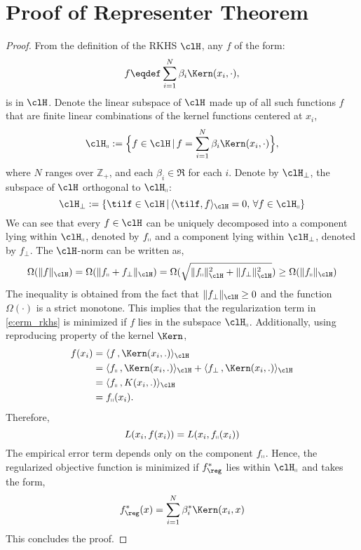 \chapter{Proof of Representer Theorem }%
\label{a:rep_theorem}

\begin{proof}
	From the definition of the RKHS $\clH$, any $f$ of the form:
	\[
	f \eqdef \sum_{i=1}^N  
	\beta_i \Kern(x_i,\cdot),
	\]
	is in $\clH$. 	
	Denote the linear subspace of $\clH$ made up of all such functions $f$ that are finite linear combinations of the kernel functions centered at $x_i$,
	\[
	\clH_\shortparallel := \Bigl\{f \in \clH\, |\, f = \sum_{i=1}^N  \beta_i \Kern(x_i,\cdot) \Bigr\},
	\]
	where $N$ ranges over $\mathbb{Z}_+$, and  each $\beta_i \in \Re$ for each $i$. Denote by $\clH_{\perp}$, the subspace of $\clH$ orthogonal to $\clH_\shortparallel$:
	\[
	\clH_\perp : = \{ \tilf \in \clH\,| \, \langle \tilf , f \rangle_\clH = 0 ,\, \forall f \in \clH_\shortparallel \}
	\]
	We can see that every $f \in \clH$ can be uniquely decomposed into a component lying within $\clH_\shortparallel$, denoted by $f_\shortparallel$ and a component lying within $\clH_\perp$, denoted by $f_\perp$.
	The $\clH$-norm can be written as,
	\[
	\Omega(\|f\|_\clH) = \Omega( \|f_\shortparallel + f_\perp\|_\clH) =\Omega( \sqrt{\|f_\shortparallel\|^2_\clH + \|f_\perp\|^2_\clH})  \geq \Omega(\|f_\shortparallel\|_\clH)
	\]
	The inequality is obtained from the fact that $\|f_\perp\|_\clH \geq 0$ and the function $\Omega(\cdot)$ is a strict monotone.
	This implies that the regularization term in \eqref{e:erm_rkhs} is minimized if $f$ lies in the subspace $\clH_\shortparallel$.
	Additionally, using reproducing property of the kernel $\Kern$,
	\[
	\begin{aligned}
	f(x_i) & =  \langle f \, , \Kern(x_i,.) \rangle_\clH\\
	&  = \langle f_\shortparallel\, , \Kern(x_i,.) \rangle_\clH + \langle f_\perp \, , \Kern(x_i,.) \rangle_\clH \\
	&  = \langle f_\shortparallel\, , K(x_i,.) \rangle_\clH \\
	&  = f_\shortparallel(x_i).
	\end{aligned}
	\]
	Therefore,
	\[
	L(x_i, f(x_i)) = L(x_i, f_\shortparallel(x_i))
	\]
	The empirical error term depends only on the component $f_\shortparallel$. Hence, the regularized objective function is minimized if $f_\reg^*$ lies within $\clH_\shortparallel$ and takes the form,
	\[
	f_\reg^*(x) = \sum_{i=1}^N  \beta_i^*  \Kern(x_i, x)
	\]
	This concludes the proof. 
\end{proof}
